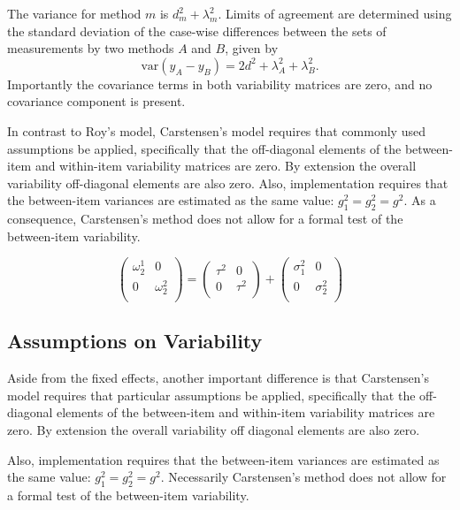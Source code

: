 \documentclass[12pt, a4paper]{report}
\theoremstyle{plain}
\theoremstyle{definition}
\theoremstyle{remark}
\begin{document}
The variance for method $m$ is $d^2_{m}+\lambda^2_{m}$. Limits of agreement are determined using the standard deviation of the case-wise differences between the sets of measurements by two methods $A$ and $B$, given by
\begin{equation}
\mbox{var} (y_{A}-y_{B}) = 2d^2 + \lambda^2_{A}+ \lambda^2_{B}.
\end{equation}
Importantly the covariance terms in both variability matrices are zero, and no covariance component is present.





In contrast to Roy's model, Carstensen's model requires that commonly used assumptions be applied, specifically that the off-diagonal elements of the between-item and within-item variability matrices are zero. By
extension the overall variability off-diagonal elements are also zero. Also, implementation requires that the between-item variances are estimated as the same value: $g^2_1 = g^2_2 = g^2$.
As a consequence, Carstensen's method does not allow for a formal test of the between-item variability.

\[\left(\begin{array}{cc}
\omega^1_2  & 0 \\
0 & \omega^2_2 \\
\end{array}  \right)
=  \left(
\begin{array}{cc}
\tau^2  & 0 \\
0 & \tau^2 \\
\end{array} \right)+
\left(
\begin{array}{cc}
\sigma^2_1  & 0 \\
0 & \sigma^2_2 \\
\end{array}\right)
\]




\subsection{Assumptions on Variability}

Aside from the fixed effects, another important difference is that Carstensen's model requires that particular assumptions be applied, specifically that the off-diagonal elements of the between-item
and within-item variability matrices are zero. By extension the
overall variability off diagonal elements are also zero.

Also, implementation requires that the between-item variances are
estimated as the same value: $g^2_1 = g^2_2 = g^2$. Necessarily
Carstensen's method does not allow for a formal test of the
between-item variability.
\end{document}
